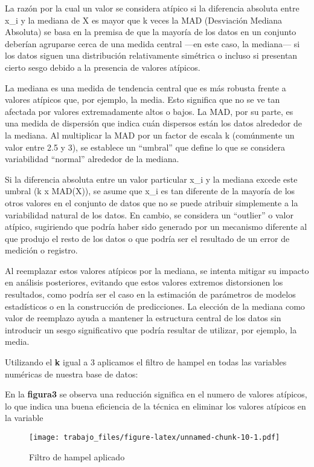 \documentclass[
  11pt,
  bookmarksnumbered]{article}
\begin{document}
La razón por la cual un valor se considera atípico si la diferencia absoluta entre x\_i y la mediana de X es mayor que k veces la MAD (Desviación Mediana Absoluta) se basa en la premisa de que la mayoría de los datos en un conjunto deberían agruparse cerca de una medida central ---en este caso, la mediana--- si los datos siguen una distribución relativamente simétrica o incluso si presentan cierto sesgo debido a la presencia de valores atípicos.

La mediana es una medida de tendencia central que es más robusta frente a valores atípicos que, por ejemplo, la media.
Esto significa que no se ve tan afectada por valores extremadamente altos o bajos.
La MAD, por su parte, es una medida de dispersión que indica cuán dispersos están los datos alrededor de la mediana.
Al multiplicar la MAD por un factor de escala k (comúnmente un valor entre 2.5 y 3), se establece un ``umbral'' que define lo que se considera variabilidad ``normal'' alrededor de la mediana.

Si la diferencia absoluta entre un valor particular x\_i y la mediana excede este umbral (k x MAD(X)), se asume que x\_i es tan diferente de la mayoría de los otros valores en el conjunto de datos que no se puede atribuir simplemente a la variabilidad natural de los datos.
En cambio, se considera un ``outlier'' o valor atípico, sugiriendo que podría haber sido generado por un mecanismo diferente al que produjo el resto de los datos o que podría ser el resultado de un error de medición o registro.

Al reemplazar estos valores atípicos por la mediana, se intenta mitigar su impacto en análisis posteriores, evitando que estos valores extremos distorsionen los resultados, como podría ser el caso en la estimación de parámetros de modelos estadísticos o en la construcción de predicciones.
La elección de la mediana como valor de reemplazo ayuda a mantener la estructura central de los datos sin introducir un sesgo significativo que podría resultar de utilizar, por ejemplo, la media.

Utilizando el \textbf{k} igual a 3 aplicamos el filtro de hampel en todas las variables numéricas de nuestra base de datos:

En la \textbf{figura3} se observa una reducción significa en el numero de valores atípicos, lo que indica una buena eficiencia de la técnica en eliminar los valores atípicos en la variable

\begin{figure}
\centering
\texttt{[image: trabajo\_files/figure-latex/unnamed-chunk-10-1.pdf]}
\caption{\label{fig:unnamed-chunk-10}Filtro de hampel aplicado}
\end{figure}
\end{document}
